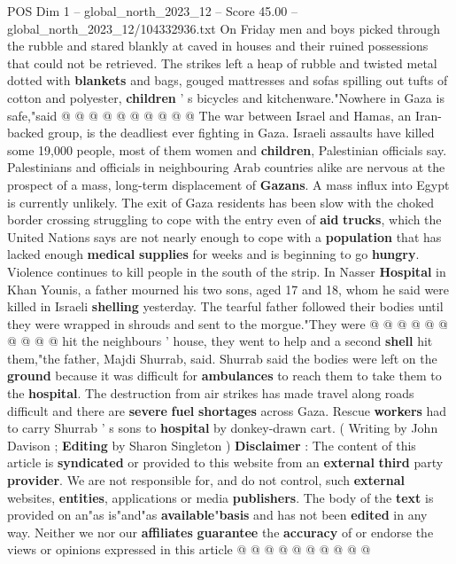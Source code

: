 \begin{textsample}{POS Dim 1 – global\_north\_2023\_12 – Score 45.00 – global\_north\_2023\_12/104332936.txt}
On Friday men and boys picked through the rubble and stared blankly at caved in houses and their ruined possessions that could not be retrieved.
The strikes left a heap of rubble and twisted metal dotted with \textbf{blankets} and bags, gouged mattresses and sofas spilling out tufts of cotton and polyester, \textbf{children} ' s bicycles and kitchenware."Nowhere in Gaza is safe,"said @ @ @ @ @ @ @ @ @ @ The war between Israel and Hamas, an Iran-backed group, is the deadliest ever fighting in Gaza.
Israeli assaults have killed some 19,000 people, most of them women and \textbf{children}, Palestinian officials say.
Palestinians and officials in neighbouring Arab countries alike are nervous at the prospect of a mass, long-term displacement of \textbf{Gazans}.
A mass influx into Egypt is currently unlikely.
The exit of Gaza residents has been slow with the choked border crossing struggling to cope with the entry even of \textbf{aid} \textbf{trucks}, which the United Nations says are not nearly enough to cope with a \textbf{population} that has lacked enough \textbf{medical} \textbf{supplies} for weeks and is beginning to go \textbf{hungry}.
Violence continues to kill people in the south of the strip.
In Nasser \textbf{Hospital} in Khan Younis, a father mourned his two sons, aged 17 and 18, whom he said were killed in Israeli \textbf{shelling} yesterday.
The tearful father followed their bodies until they were wrapped in shrouds and sent to the morgue."They were @ @ @ @ @ @ @ @ @ @ hit the neighbours ' house, they went to help and a second \textbf{shell} hit them,"the father, Majdi Shurrab, said.
Shurrab said the bodies were left on the \textbf{ground} because it was difficult for \textbf{ambulances} to reach them to take them to the \textbf{hospital}.
The destruction from air strikes has made travel along roads difficult and there are \textbf{severe} \textbf{fuel} \textbf{shortages} across Gaza.
Rescue \textbf{workers} had to carry Shurrab ' s sons to \textbf{hospital} by donkey-drawn cart. ( Writing by John Davison ; \textbf{Editing} by Sharon Singleton ) \textbf{Disclaimer} : The content of this article is \textbf{syndicated} or provided to this website from an \textbf{external} \textbf{third} party \textbf{provider}.
We are not responsible for, and do not control, such \textbf{external} websites, \textbf{entities}, applications or media \textbf{publishers}.
The body of the \textbf{text} is provided on an"as is"and"as \textbf{available}"\textbf{basis} and has not been \textbf{edited} in any way.
Neither we nor our \textbf{affiliates} \textbf{guarantee} the \textbf{accuracy} of or endorse the views or opinions expressed in this article @ @ @ @ @ @ @ @ @ @

\end{textsample}
